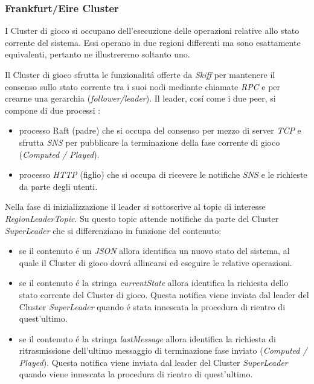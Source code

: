 \documentclass{sig-alternate-05-2015}
\begin{document}
\subsubsection{Frankfurt/Eire Cluster}


I Cluster di gioco si occupano dell'esecuzione delle operazioni relative allo stato corrente del sistema. Essi operano in due regioni differenti ma sono esattamente equivalenti, pertanto ne illustreremo soltanto uno. 

Il Cluster di gioco sfrutta le funzionalit\'a offerte da \textit{Skiff} per mantenere il consenso sullo stato corrente tra i suoi nodi mediante chiamate \textit{RPC} e per crearne una gerarchia (\textit{follower/leader}).
Il leader, cos\'i come i due peer, si compone di due processi :
\begin{itemize}
\item processo Raft (padre) che si occupa del consenso per mezzo di server \textit{TCP} e sfrutta \textit{SNS} per pubblicare la terminazione della fase corrente di gioco (\textit{Computed / Played}).
\item processo \textit{HTTP} (figlio) che si occupa di ricevere le notifiche \textit{SNS} e le richieste da parte degli utenti.
\end{itemize}

Nella fase di inizializzazione il leader si sottoscrive al topic di interesse \textit{RegionLeaderTopic}. Su questo topic attende notifiche da parte del Cluster \textit{SuperLeader} che si differenziano in funzione del contenuto:
\begin{itemize}
\item se il contenuto \'e un \textit{JSON} allora identifica un nuovo stato del sistema, al quale il Cluster di gioco dovr\'a allinearsi ed eseguire le relative operazioni.
\item se il contenuto \'e la stringa \textit{currentState} allora identifica la richiesta dello stato corrente del Cluster di gioco. Questa notifica viene inviata dal leader del Cluster \textit{SuperLeader} quando \'e stata innescata la procedura di rientro di quest'ultimo.
\item se il contenuto \'e la stringa \textit{lastMessage} allora identifica la richiesta di ritrasmissione dell'ultimo messaggio di terminazione fase inviato (\textit{Computed / Played}). Questa notifica viene inviata dal leader del Cluster \textit{SuperLeader} quando viene innescata la procedura di rientro di quest'ultimo.
\end{itemize} 
\end{document}
